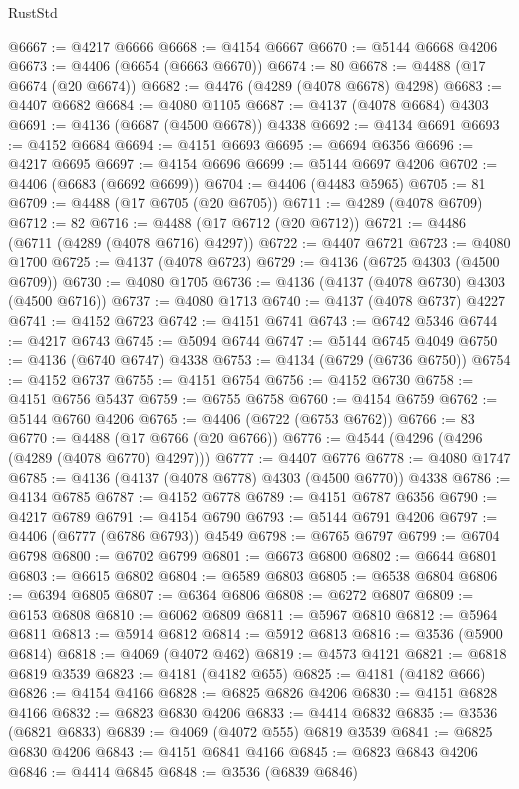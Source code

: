 \begin{lexlean}{RustStd}
\begin{coremodule}
@6667 := @4217 @6666
@6668 := @4154 @6667
@6670 := @5144 @6668 @4206
@6673 := @4406 (@6654 (@6663 @6670))
@6674 := 80
@6678 := @4488 (@17 @6674 (@20 @6674))
@6682 := @4476 (@4289 (@4078 @6678) @4298)
@6683 := @4407 @6682
@6684 := @4080 @1105
@6687 := @4137 (@4078 @6684) @4303
@6691 := @4136 (@6687 (@4500 @6678)) @4338
@6692 := @4134 @6691
@6693 := @4152 @6684
@6694 := @4151 @6693
@6695 := @6694 @6356
@6696 := @4217 @6695
@6697 := @4154 @6696
@6699 := @5144 @6697 @4206
@6702 := @4406 (@6683 (@6692 @6699))
@6704 := @4406 (@4483 @5965)
@6705 := 81
@6709 := @4488 (@17 @6705 (@20 @6705))
@6711 := @4289 (@4078 @6709)
@6712 := 82
@6716 := @4488 (@17 @6712 (@20 @6712))
@6721 := @4486 (@6711 (@4289 (@4078 @6716) @4297))
@6722 := @4407 @6721
@6723 := @4080 @1700
@6725 := @4137 (@4078 @6723)
@6729 := @4136 (@6725 @4303 (@4500 @6709))
@6730 := @4080 @1705
@6736 := @4136 (@4137 (@4078 @6730) @4303 (@4500 @6716))
@6737 := @4080 @1713
@6740 := @4137 (@4078 @6737) @4227
@6741 := @4152 @6723
@6742 := @4151 @6741
@6743 := @6742 @5346
@6744 := @4217 @6743
@6745 := @5094 @6744
@6747 := @5144 @6745 @4049
@6750 := @4136 (@6740 @6747) @4338
@6753 := @4134 (@6729 (@6736 @6750))
@6754 := @4152 @6737
@6755 := @4151 @6754
@6756 := @4152 @6730
@6758 := @4151 @6756 @5437
@6759 := @6755 @6758
@6760 := @4154 @6759
@6762 := @5144 @6760 @4206
@6765 := @4406 (@6722 (@6753 @6762))
@6766 := 83
@6770 := @4488 (@17 @6766 (@20 @6766))
@6776 := @4544 (@4296 (@4296 (@4289 (@4078 @6770) @4297)))
@6777 := @4407 @6776
@6778 := @4080 @1747
@6785 := @4136 (@4137 (@4078 @6778) @4303 (@4500 @6770)) @4338
@6786 := @4134 @6785
@6787 := @4152 @6778
@6789 := @4151 @6787 @6356
@6790 := @4217 @6789
@6791 := @4154 @6790
@6793 := @5144 @6791 @4206
@6797 := @4406 (@6777 (@6786 @6793)) @4549
@6798 := @6765 @6797
@6799 := @6704 @6798
@6800 := @6702 @6799
@6801 := @6673 @6800
@6802 := @6644 @6801
@6803 := @6615 @6802
@6804 := @6589 @6803
@6805 := @6538 @6804
@6806 := @6394 @6805
@6807 := @6364 @6806
@6808 := @6272 @6807
@6809 := @6153 @6808
@6810 := @6062 @6809
@6811 := @5967 @6810
@6812 := @5964 @6811
@6813 := @5914 @6812
@6814 := @5912 @6813
@6816 := @3536 (@5900 @6814)
@6818 := @4069 (@4072 @462)
@6819 := @4573 @4121
@6821 := @6818 @6819 @3539
@6823 := @4181 (@4182 @655)
@6825 := @4181 (@4182 @666)
@6826 := @4154 @4166
@6828 := @6825 @6826 @4206
@6830 := @4151 @6828 @4166
@6832 := @6823 @6830 @4206
@6833 := @4414 @6832
@6835 := @3536 (@6821 @6833)
@6839 := @4069 (@4072 @555) @6819 @3539
@6841 := @6825 @6830 @4206
@6843 := @4151 @6841 @4166
@6845 := @6823 @6843 @4206
@6846 := @4414 @6845
@6848 := @3536 (@6839 @6846)

\end{coremodule}
\end{lexlean}
